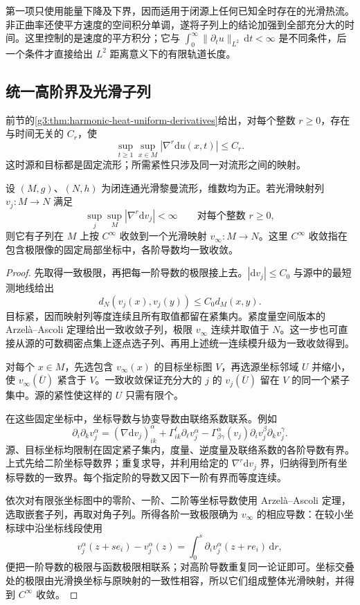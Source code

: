 第一项只使用能量下降及下界，因而适用于闭源上任何已知全时存在的光滑热流。非正曲率还使平方速度的空间积分单调，遂将子列上的结论加强到全部充分大的时间。这里控制的是速度的平方积分；它与 \(\int_0^\infty\|\partial_tu\|_{L^2}\,\mathrm dt<\infty\) 是不同条件，后一个条件才直接给出 \(L^2\) 距离意义下的有限轨道长度。

\subsection{统一高阶界及光滑子列}
\label{g3:subsec:2605:02}
前节的\cref{g3:thm:harmonic-heat-uniform-derivatives}给出，对每个整数 \(r\ge0\)，存在与时间无关的 \(C_r\)，使
\begin{equation}\label{g3:eq:harmonic-heat-orbit-derivatives}
	\sup_{t\ge1}\sup_{x\in M}|\nabla^r\mathrm du(x,t)|\le C_r.
\end{equation}
这时源和目标都是固定流形；所需紧性只涉及同一对流形之间的映射。

\begin{lemma}\label{g3:lem:compact-target-map-smooth-precompactness}
	设 \((M,g)\)、\((N,h)\) 为闭连通光滑黎曼流形，维数均为正。若光滑映射列 \(v_j:M\to N\) 满足
	\[
		\sup_j\sup_M|\nabla^r\mathrm dv_j|<\infty
		\qquad\text{对每个整数 }r\ge0,
	\]
	则它有子列在 \(M\) 上按 \(C^\infty\) 收敛到一个光滑映射 \(v_\infty:M\to N\)。这里 \(C^\infty\) 收敛指在包含极限像的固定局部坐标中，各阶导数均一致收敛。
\end{lemma}
\begin{proof}
	先取得一致极限，再把每一阶导数的极限接上去。\(|\mathrm dv_j|\le C_0\) 与源中的最短测地线给出
	\[
		d_N(v_j(x),v_j(y))\le C_0d_M(x,y).
	\]
	目标紧，因而映射列等度连续且所有取值都留在紧集内。紧度量空间版本的 Arzel\`a--Ascoli 定理给出一致收敛子列，极限 \(v_\infty\) 连续并取值于 \(N\)。这一步也可直接从源的可数稠密点集上逐点选子列、再用上述统一连续模升级为一致收敛得到。

	对每个 \(x\in M\)，先选包含 \(v_\infty(x)\) 的目标坐标图 \(V\)，再选源坐标邻域 \(U\) 并缩小，使 \(v_\infty(\overline U)\) 紧含于 \(V\)。一致收敛保证充分大的 \(j\) 的 \(v_j(\overline U)\) 留在 \(V\) 的同一个紧子集中。源的紧性使这样的 \(U\) 只需有限个。

	在这些固定坐标中，坐标导数与协变导数由联络系数联系。例如
	\[
		\partial_i\partial_kv_j^\alpha
		=(\nabla\mathrm dv_j)_{ik}^{\alpha}
		+\Gamma^\ell_{ik}\partial_\ell v_j^\alpha
		-\Gamma^{\alpha}_{\beta\gamma}(v_j)
		\partial_i v_j^\beta\partial_k v_j^\gamma.
	\]
	源、目标坐标均限制在固定紧子集内，度量、逆度量及联络系数的各阶导数有界。上式先给二阶坐标导数界；重复求导，并利用给定的 \(\nabla^r\mathrm dv_j\) 界，归纳得到所有坐标导数的一致界。每个指定阶的导数又因下一阶有界而等度连续。

	依次对有限张坐标图中的零阶、一阶、二阶等坐标导数使用 Arzel\`a--Ascoli 定理，选取嵌套子列，再取对角子列。所得各阶一致极限确为 \(v_\infty\) 的相应导数：在较小坐标球中沿坐标线段使用
	\[
		v_j^\alpha(z+se_i)-v_j^\alpha(z)
		=\int_0^s\partial_i v_j^\alpha(z+re_i)\,\mathrm dr,
	\]
	便把一阶导数的极限与函数极限相联系；对高阶导数重复同一论证即可。坐标交叠处的极限由光滑换坐标与原映射的一致性相容，所以它们组成整体光滑映射，并得到 \(C^\infty\) 收敛。
\end{proof}

